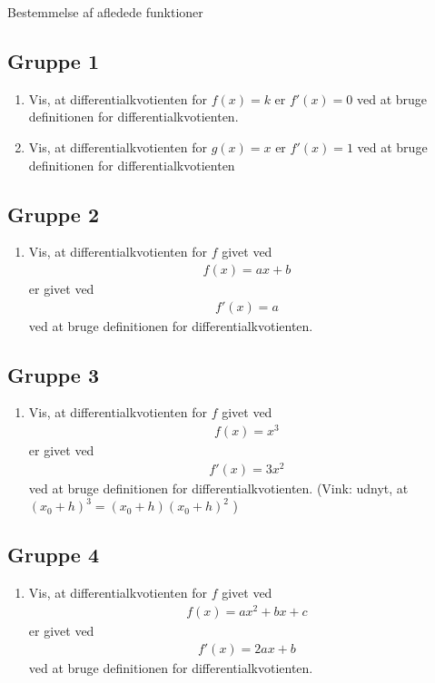 
\begin{center}
	\Huge
	Bestemmelse af afledede funktioner
\end{center}

\subsection*{Gruppe 1}

\begin{enumerate}[label=\roman*)]
	\item Vis, at differentialkvotienten for $f(x) = k$ er $f'(x) = 0$ ved at bruge definitionen for
	differentialkvotienten.
	\item Vis, at differentialkvotienten for $g(x) = x$ er $f'(x) = 1$ ved at bruge definitionen for 
	differentialkvotienten
\end{enumerate}

\subsection*{Gruppe 2}
\begin{enumerate}[label=\roman*)]
	\item Vis, at differentialkvotienten for $f$ givet ved
	\begin{align*}
		f(x) = ax + b
	\end{align*}
	er givet ved
	\begin{align*}
		f'(x) = a
	\end{align*}
	ved at bruge definitionen for differentialkvotienten. 
\end{enumerate}

\subsection*{Gruppe 3}
\begin{enumerate}[label=\roman*)]
	\item Vis, at differentialkvotienten for $f$ givet ved
	\begin{align*}
		f(x) = x^3
	\end{align*}
	er givet ved
	\begin{align*}
		f'(x) = 3x^2
	\end{align*}
	ved at bruge definitionen for differentialkvotienten. (Vink: udnyt, at $(x_0+h)^3 = (x_0+h)(x_0+h)^2$ )
\end{enumerate}

\subsection*{Gruppe 4}
\begin{enumerate}[label=\roman*)]
	\item Vis, at differentialkvotienten for $f$ givet ved
	\begin{align*}
		f(x) = ax^2+bx+c
	\end{align*}
	er givet ved
	\begin{align*}
		f'(x) = 2ax+b
	\end{align*}
	ved at bruge definitionen for differentialkvotienten.
\end{enumerate}

